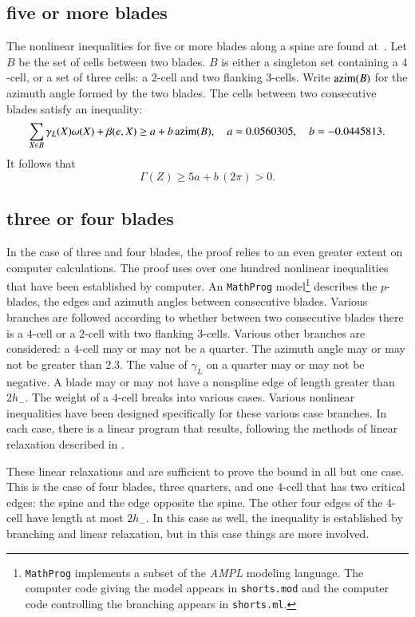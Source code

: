 \subsection{five or more blades}

The nonlinear inequalities for five or more blades along a spine are found at~\cite[cc:5bl:ZTGIJCF]{hales:2009:nonlinear}.   Let $B$ be the set of cells between two blades.  $B$ is either a singleton set containing a $4$-cell, or a set of three cells: a $2$-cell and two flanking $3$-cells.  Write ${\operatorname{azim}}(B)$ for the azimuth angle formed by the two blades.   The cells between two consecutive blades satisfy an inequality:
$$
\sum_{X\in B} \gamma_L(X)\omega(X) + \beta(e,X) \ge a + b\,{\operatorname{azim}}(B),
\quad a= 0.0560305, \quad b= -0.0445813.
$$
It follows that
$$
\Gamma(Z) \ge 5 a + b\, (2\pi) > 0.
$$

\subsection{three or four blades}

In the case of three and four blades, the proof relies to an even greater extent on computer calculations.
The proof uses over one hundred nonlinear inequalities that have been established by computer.  An {\tt MathProg} model\footnote{{\tt MathProg} implements a subset of the {\it AMPL} modeling language.  The computer code giving the model appears in {\tt shorts.mod} and the computer code controlling the branching appears in {\tt shorts.ml}.} describes the $p$-blades, the edges and azimuth angles between consecutive blades.  Various branches are followed according to whether between two consecutive blades there is a $4$-cell or a $2$-cell with two flanking $3$-cells.   Various other branches are considered: a $4$-cell may or may not be a quarter.  The azimuth angle may or may not be greater than $2.3$.  The value of $\gamma_L$ on a quarter may or may not be negative.  A blade may or may not have a nonspline edge of length greater than $2h_-$.  The weight of a $4$-cell breaks into various cases.   Various nonlinear inequalities have been designed specifically for these various case branches.  In each case, there is a linear program that results, following the methods of linear relaxation described in \cite{Hales:2006:DCG}.  

These linear relaxations and are sufficient to prove the bound in all but one case.  This is the case of four blades, three quarters, and one $4$-cell that has two critical edges: the spine and the edge opposite the spine.  The other four edges of the $4$-cell have length at most $2h_-$.  In this case as well, the inequality is established by branching and linear relaxation, but in this case things are more involved.  

